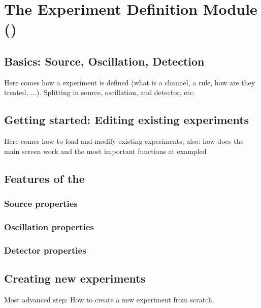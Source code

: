 
\part{The Experiment Definition Module (\EDM )}

\chapter{Basics: Source, Oscillation, Detection}

Here comes how a experiment is defined (what is a channel, a rule, how are they treated, ...). Splitting in source, oscillation, and detector, etc.

\chapter{Getting started: Editing existing experiments}

Here comes how to load and modify existing experiments;
also: how does the main screen work and the most important functions at exampled

\chapter{Features of the \EDM }

\section{Source properties}

\section{Oscillation properties}

\section{Detector properties}

\chapter{Creating new experiments}

Most advanced step: How to create a new experiment from scratch.
